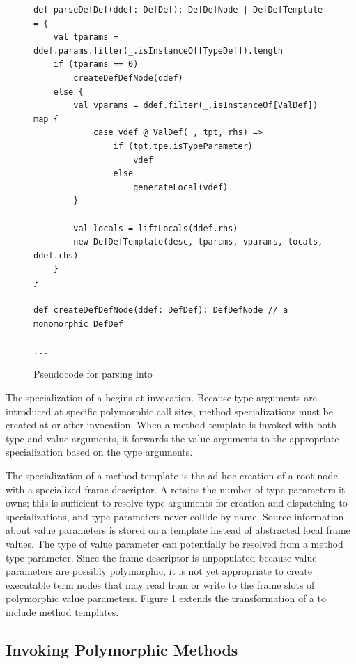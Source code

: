\begin{figure}[!htb]
\begin{verbatim}
def parseDefDef(ddef: DefDef): DefDefNode | DefDefTemplate = {		
	val tparams = ddef.params.filter(_.isInstanceOf[TypeDef]).length
	if (tparams == 0)
		createDefDefNode(ddef)
	else {
		val vparams = ddef.filter(_.isInstanceOf[ValDef]) map {
			case vdef @ ValDef(_, tpt, rhs) => 
				if (tpt.tpe.isTypeParameter) 
					vdef
				else
					generateLocal(vdef)
		}
	
		val locals = liftLocals(ddef.rhs)
		new DefDefTemplate(desc, tparams, vparams, locals, ddef.rhs)
	}
}

def createDefDefNode(ddef: DefDef): DefDefNode // a monomorphic DefDef
	
...
\end{verbatim}
\caption{Pseudocode for parsing  into }
\label{impl:parse-poly-defdef}
\end{figure}

The specialization of a  begins at invocation.
Because type arguments are introduced at specific polymorphic call sites, method specializations must be created at or after invocation.
When a method template is invoked with both type and value arguments, it forwards the value arguments to the appropriate specialization based on the type arguments.

The specialization of a method template is the ad hoc creation of a root node with a specialized frame descriptor.
A  retains the number of type parameters it owns; this is sufficient to resolve type arguments for creation and dispatching to specializations, and type parameters never collide by name.
Source information about value parameters is stored on a template instead of abstracted local frame values.
The type of value parameter can potentially be resolved from a method type parameter.
Since the frame descriptor is unpopulated because value parameters are possibly polymorphic, it is not yet appropriate to create executable term nodes that may read from or write to the frame slots of polymorphic value parameters.
Figure \ref{impl:parse-poly-defdef} extends the transformation of a  to include method templates.

\subsection{Invoking Polymorphic Methods}

